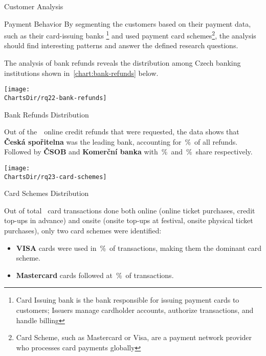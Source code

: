 \begin{section}{Customer Analysis}
\begin{subsection}{Payment Behavior}
		By segmenting the customers based on their payment data,
		such as their card-issuing banks
		\footnote{Card Issuing bank is the bank responsible for issuing payment cards to customers; Issuers manage cardholder accounts, authorize transactions, and handle billing\cite{jc_what_are_card_schemes_and_how_do_they_work}} and used
		payment card schemes\footnote{Card Scheme, such as Mastercard or Visa, are a payment network provider who processes card payments globally\cite{jc_what_are_card_schemes_and_how_do_they_work}}, the analysis should find interesting
		patterns and answer the defined research questions.


		The analysis of bank refunds reveals the distribution among Czech banking institutions shown in~\autoref{chart:bank-refunds} below.

		\begin{chart}[h]
			\centering
			\texttt{[image: \\ChartsDir/rq22-bank-refunds]}
			\caption{ Bank Refunds Distribution}
			\label{chart:bank-refunds}
			\source
		\end{chart}

		Out of the~~online credit refunds that were requested, the data shows that \textbf{Česká spořitelna} was the leading bank, accounting for~\%~of all refunds.
		Followed by \textbf{ČSOB} and \textbf{Komerční banka} with~\%~and~\%~share respectively.


		\begin{chart}[h]
			\centering
			\texttt{[image: \\ChartsDir/rq23-card-schemes]}
			\caption{ Card Schemes Distribution}
			\label{chart:card-schemes}
			\source
		\end{chart}

		Out of total ~card transactions done both online (online ticket purchases, credit top-ups in advance) and onsite (onsite top-ups at festival, onsite physical ticket purchases), only two card schemes were identified:
		\begin{itemize}
			\item \textbf{VISA} cards were used in~\%~of transactions, making them the dominant card scheme.
			\item \textbf{Mastercard} cards followed at~\%~of transactions.
		\end{itemize}


\end{subsection}
\end{section}
